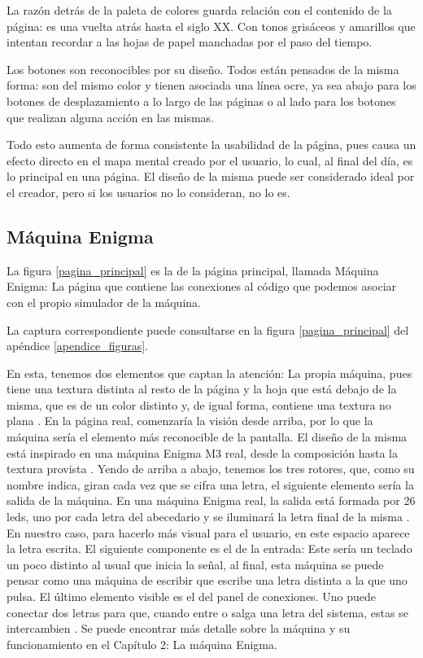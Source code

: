 La razón detrás de la paleta de colores guarda relación con el contenido de la página: es una vuelta atrás hasta el siglo XX. Con tonos grisáceos y amarillos que intentan recordar a las hojas de papel manchadas por el paso del tiempo.

Los botones son reconocibles por su diseño. Todos están pensados de la misma forma: son del mismo color y tienen asociada una línea ocre, ya sea abajo para los botones de desplazamiento a lo largo de las páginas o al lado para los botones que realizan alguna acción en las mismas. 

Todo esto aumenta de forma consistente la usabilidad de la página, pues causa un efecto directo en el mapa mental creado por el usuario, lo cual, al final del día, es lo principal en una página. El diseño de la misma puede ser considerado ideal por el creador, pero si los usuarios no lo consideran, no lo es.


\subsection{Máquina Enigma}

La figura \ref{pagina_principal} es la de la página principal, llamada Máquina Enigma: La página que contiene las conexiones al código que podemos asociar con el propio simulador de la máquina.

La captura correspondiente puede consultarse en la figura \ref{pagina_principal} del apéndice \ref{apendice_figuras}.

En esta, tenemos dos elementos que captan la atención: La propia máquina, pues tiene una textura distinta al resto de la página y la hoja que está debajo de la misma, que es de un color distinto y, de igual forma, contiene una textura no plana \cite{pinterest_hormigon}.  En la página real, comenzaría la visión desde arriba, por lo que la máquina sería el elemento más reconocible de la pantalla. El diseño de la misma está inspirado en una máquina Enigma M3 real, desde la composición hasta la textura provista \cite{lainakai_enigma}. Yendo de arriba a abajo, tenemos los tres rotores, que, como su nombre indica, giran cada vez que se cifra una letra, el siguiente elemento sería la salida de la máquina. En una máquina Enigma real, la salida está formada por 26 leds, uno por cada letra del abecedario y se iluminará la letra final de la misma \cite{cripta_hacker_enigma}. En nuestro caso, para hacerlo más visual para el usuario, en este espacio aparece la letra escrita. El siguiente componente es el de la entrada: Este sería un teclado un poco distinto al usual que inicia la señal, al final, esta máquina se puede pensar como una máquina de escribir que escribe una letra distinta a la que uno pulsa. El último elemento visible es el del panel de conexiones. Uno puede conectar dos letras para que, cuando entre o salga una letra del sistema, estas se intercambien \cite{cripta_hacker_enigma}. Se puede encontrar más detalle sobre la máquina y su funcionamiento en el Capítulo 2: La máquina Enigma.

